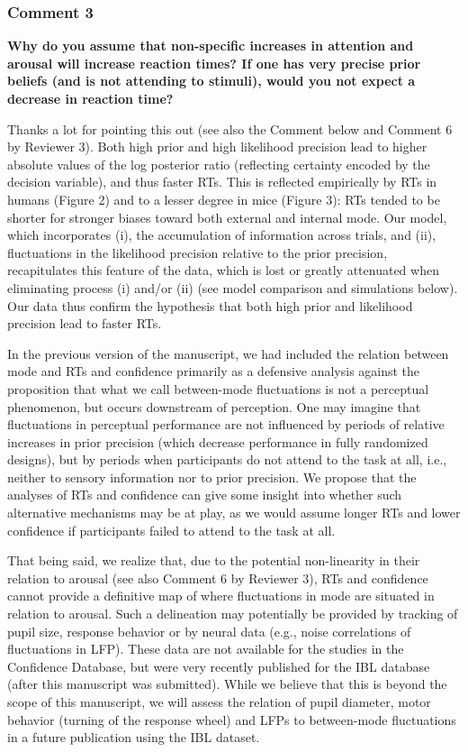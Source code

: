 \documentclass[
]{article}
\begin{document}
\hypertarget{comment-3}{%
\subsubsection{Comment 3}\label{comment-3}}

\textbf{Why do you assume that non-specific increases in attention and
arousal will increase reaction times? If one has very precise prior
beliefs (and is not attending to stimuli), would you not expect a
decrease in reaction time?}

Thanks a lot for pointing this out (see also the Comment below and
Comment 6 by Reviewer 3). Both high prior and high likelihood precision
lead to higher absolute values of the log posterior ratio (reflecting
certainty encoded by the decision variable), and thus faster RTs. This
is reflected empirically by RTs in humans (Figure 2) and to a lesser
degree in mice (Figure 3): RTs tended to be shorter for stronger biases
toward both external and internal mode. Our model, which incorporates
(i), the accumulation of information across trials, and (ii),
fluctuations in the likelihood precision relative to the prior
precision, recapitulates this feature of the data, which is lost or
greatly attenuated when eliminating process (i) and/or (ii) (see model
comparison and simulations below). Our data thus confirm the hypothesis
that both high prior and likelihood precision lead to faster RTs.

In the previous version of the manuscript, we had included the relation
between mode and RTs and confidence primarily as a defensive analysis
against the proposition that what we call between-mode fluctuations is
not a perceptual phenomenon, but occurs downstream of perception. One
may imagine that fluctuations in perceptual performance are not
influenced by periods of relative increases in prior precision (which
decrease performance in fully randomized designs), but by periods when
participants do not attend to the task at all, i.e., neither to sensory
information nor to prior precision. We propose that the analyses of RTs
and confidence can give some insight into whether such alternative
mechanisms may be at play, as we would assume longer RTs and lower
confidence if participants failed to attend to the task at all.

That being said, we realize that, due to the potential non-linearity in
their relation to arousal (see also Comment 6 by Reviewer 3), RTs and
confidence cannot provide a definitive map of where fluctuations in mode
are situated in relation to arousal. Such a delineation may potentially
be provided by tracking of pupil size, response behavior or by neural
data (e.g., noise correlations of fluctuations in LFP). These data are
not available for the studies in the Confidence Database, but were very
recently published for the IBL database (after this manuscript was
submitted). While we believe that this is beyond the scope of this
manuscript, we will assess the relation of pupil diameter, motor
behavior (turning of the response wheel) and LFPs to between-mode
fluctuations in a future publication using the IBL dataset.
\end{document}
